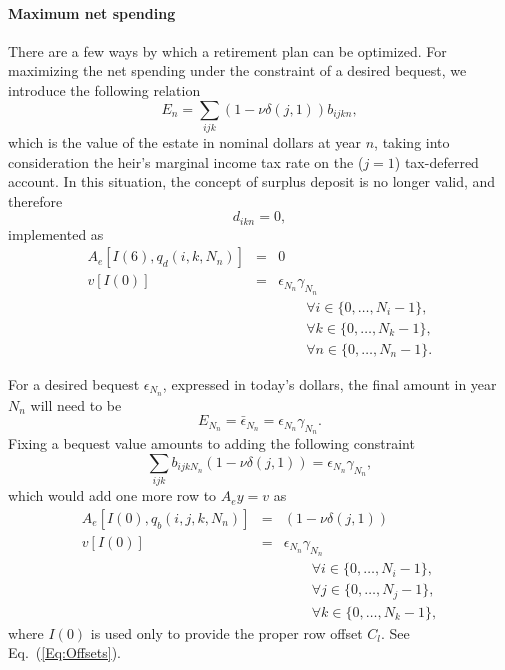 \documentclass{article}[fleqn,12pt]
\begin{document}
\paragraph*{Maximum net spending}
There are a few ways by which a retirement plan can be optimized. For maximizing the net spending under
the constraint of a desired bequest, we introduce the following relation
\begin{equation}
	\label{Eq:Bequest}
	E_n = \sum_{ijk} (1 - \nu\delta(j, 1)) b_{ijkn},
\end{equation}
which is the value of the estate in nominal dollars at year $n$,
taking into consideration the heir's marginal income tax rate on the ($j=1$) tax-deferred account. 
In this situation, the concept of surplus deposit is no longer valid, and therefore
\begin{equation}
	d_{ikn} = 0,
\end{equation}
implemented as
\begin{eqnarray}
	A_e[I(6), q_d(i, k, N_n)] &=& 0 \nonumber \\
	v[I(0)] &=& \epsilon_{N_n}\gamma_{N_n} \\
	&&\qquad\forall i \in \{0,\ldots, N_i-1\},\nonumber\\
	&&\qquad\forall k \in \{0,\ldots, N_k-1\},\nonumber\\
	&&\qquad\forall n \in \{0,\ldots, N_n-1\}.\nonumber
\end{eqnarray}

For a desired bequest $\epsilon_{N_n}$, expressed in today's
dollars, the final amount in year $N_n$ will need to be
\begin{equation}
	E_{N_n} = \bar\epsilon_{N_n} = \epsilon_{N_n} \gamma_{N_n}.
\end{equation}
Fixing a bequest value amounts to adding the following constraint
\begin{equation}
	\sum_{ijk} b_{ijkN_n} (1 - \nu\delta(j, 1)) = \epsilon_{N_n} \gamma_{N_n},
\end{equation}
which would add one more row to $A_ey = v$ as
\begin{eqnarray}
	A_e[I(0), q_b(i, j, k, N_n)] &=& (1 - \nu\delta(j, 1)) \nonumber \\
	v[I(0)] &=& \epsilon_{N_n}\gamma_{N_n} \\
	&&\qquad\forall i \in \{0,\ldots, N_i-1\},\nonumber\\
	&&\qquad\forall j \in \{0,\ldots, N_j-1\},\nonumber\\
	&&\qquad\forall k \in \{0,\ldots, N_k-1\},\nonumber
\end{eqnarray}
where $I(0)$ is used only to provide the proper row offset $C_l$. See Eq.~(\ref{Eq:Offsets}).
\end{document}
